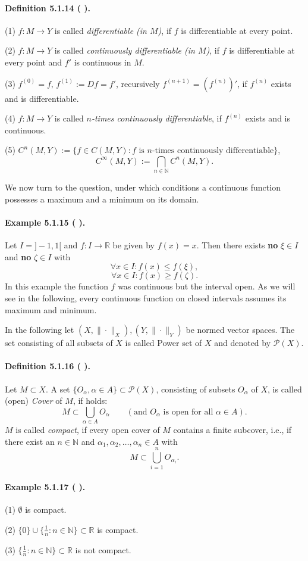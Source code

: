 \documentclass[12pt]{article}
\newcommand{\N}{\mathbb{N}}
\newcommand{\R}{\mathbb{R}}
\newcommand{\NumberedDefinition}[3]{%
\paragraph*{Definition #1 ( #2 ).} #3\par}
\newcommand{\NumberedExample}[3]{%
\paragraph*{Example #1 ( #2 ).} #3\par}
\begin{document}
\NumberedDefinition{5.1.14}{}{
(1) $f : M \to Y$ is called \textit{differentiable (in $M$)}, if $f$ is differentiable at every point.
\par
(2) $f : M \to Y$ is called \textit{continuously differentiable (in $M$)}, if $f$ is differentiable at every point and $f'$ is continuous in $M$.
\par
(3) $f^{(0)} = f, \, f^{(1)} := Df = f'$, recursively $f^{(n+1)} = (f^{(n)})'$, if $f^{(n)}$ exists and is differentiable.
\par
(4) $f : M \to Y$ is called \textit{$n$-times continuously differentiable}, if $f^{(n)}$ exists and is continuous.
\par
(5) $C^n(M, Y) := \{ f \in C(M, Y) : f \text{ is } n\text{-times continuously differentiable} \}$,
\[
C^\infty(M, Y) := \bigcap_{n \in \N} C^n(M, Y).
\]
}

We now turn to the question, under which conditions a continuous function possesses a maximum and a minimum on its domain.

\NumberedExample{5.1.15}{}{Let $I = ]-1, 1[$ and $f : I \to \R$ be given by $f(x) = x$. Then there exists \textbf{no} $\xi \in I$ and \textbf{no} $\zeta \in I$ with
\[
\forall x \in I : f(x) \le f(\xi),
\]
\[
\forall x \in I : f(x) \ge f(\zeta).
\]
In this example the function $f$ was continuous but the interval open. As we will see in the following, every continuous function on closed intervals assumes its maximum and minimum.
\par
In the following let $(X, \|\cdot\|_X), (Y, \|\cdot\|_Y)$ be normed vector spaces. The set consisting of all subsets of $X$ is called Power set of $X$ and denoted by $\mathcal{P}(X)$.}

\NumberedDefinition{5.1.16}{}{Let $M \subset X$. A set $\{O_\alpha, \alpha \in A\} \subset \mathcal{P}(X)$, consisting of subsets $O_\alpha$ of $X$, is called (open) \textit{Cover} of $M$, if holds:
\[
M \subset \bigcup_{\alpha \in A} O_\alpha \qquad (\text{and } O_\alpha \text{ is open for all } \alpha \in A).
\]
$M$ is called \textit{compact}, if every open cover of $M$ contains a finite subcover, i.e., if there exist an $n \in \N$ and $\alpha_1, \alpha_2, \dots, \alpha_n \in A$ with
\[
M \subset \bigcup_{i=1}^n O_{\alpha_i}.
\]
}

\NumberedExample{5.1.17}{}{
(1) $\emptyset$ is compact.
\par
(2) $\{0\} \cup \{\frac{1}{n} : n \in \N\} \subset \R$ is compact.
\par
(3) $\{\frac{1}{n} : n \in \N\} \subset \R$ is not compact.
}
\end{document}
